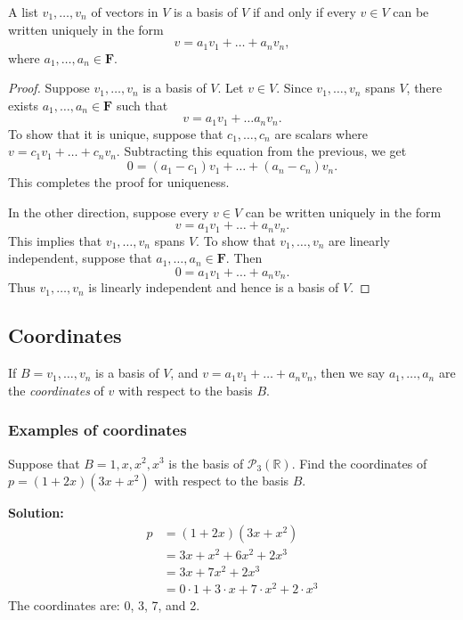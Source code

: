 \documentclass[11pt]{article}
\begin{document}
    A list \(v_1, \dots, v_n\) of vectors in $V$ is a basis of $V$ if and only if every \(v \in V\) can be written uniquely in the form \[v = a_1 v_1 + \dots + a_n v_n,\] where \(a_1, \dots, a_n \in \textbf{F}.\)

    \begin{proof}
        Suppose \(v_1, \dots, v_n\) is a basis of $V$. Let \(v \in V\). Since \(v_1, \dots, v_n\) spans $V$, there exists \(a_1, \dots, a_n \in \textbf{F}\) such that \[v = a_1 v_1 + \dots  a_n v_n.\] To show that it is unique, suppose that \(c_1, \dots, c_n\) are scalars where \(v = c_1 v_1 + \dots + c_n v_n\). Subtracting this equation from the previous, we get \[0 = (a_1 - c_1) v_1 + \dots + (a_n - c_n)v_n.\] This completes the proof for uniqueness.

        In the other direction, suppose every \(v \in V\) can be written uniquely in the form \[v = a_1 v_1 + \dots + a_n v_n.\] This implies that \(v_1, \dots, v_n\) spans $V$. To show that \(v_1, \dots, v_n\) are linearly independent, suppose that \(a_1, \dots, a_n \in \textbf{F}\). Then \[0 = a_1 v_1 + \dots + a_n v_n.\] Thus \(v_1, \dots, v_n\) is linearly independent and hence is a basis of $V$.
    \end{proof}

    \subsection{Coordinates}

    If \(B = v_1, \dots, v_n\) is a basis of $V$, and \(v = a_1 v_1 + \dots + a_n v_n\), then we say \(a_1, \dots, a_n\) are the \emph{coordinates} of $v$ with respect to the basis $B$.

    \subsubsection{Examples of coordinates}

    Suppose that \(B = 1,x,x^2, x^3\) is the basis of \(\mathcal{P}_3 (\mathbb{R})\). Find the coordinates of \(p = (1+2x)(3x + x^2)\) with respect to the basis $B$.

    \vspace{1em}

    \textbf{Solution:}
    \begin{align*}
        p &= (1 + 2x)(3x + x^2) \\
          &= 3x + x^2 + 6x^2 + 2x^3 \\
          &= 3x + 7x^2 + 2x^3 \\
          &= 0 \cdot 1 + 3 \cdot x + 7 \cdot x^2 + 2 \cdot x^3
    \end{align*}
    The coordinates are: 0, 3, 7, and 2.
\end{document}
